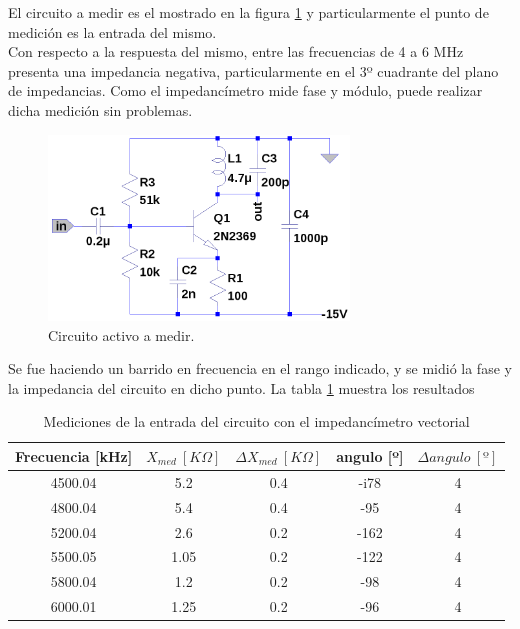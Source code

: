 \documentclass[a4paper,10pt]{article}
\begin{document}
		\indent El circuito a medir es el mostrado en la figura \ref{img006} y 
		particularmente el punto de medición es la entrada del mismo. \\
		\indent Con respecto a la respuesta del mismo, entre las frecuencias 
		de 4 a 6 MHz presenta una impedancia negativa, particularmente en el 3º
		cuadrante del plano de impedancias. Como el impedancímetro mide fase y
		módulo, puede realizar dicha medición sin problemas.
		
		\begin{figure}[!htb]
			\centering
			\includegraphics[width=8cm]{Imagenes/ActiveCircuit.png}
			\caption{Circuito activo a medir.}
			\label{img006} 
		\end{figure}

		\indent Se fue haciendo un barrido en frecuencia en el rango indicado,
		y se midió la fase y la impedancia del circuito en dicho punto. La 
		tabla \ref{tabbla} muestra los resultados

		\begin{table}[!htp]
			\centering
			\begin{tabular}{|c|c|c|c|c|}
				\hline
				Frecuencia [kHz] & $X_{med}~[K\Omega]$ & 
				$\Delta X_{med}~[K\Omega]$ & angulo [º] & $\Delta angulo~[º]$ \\
				\hline
				4500.04 & 5.2 & 0.4 & -i78 & 4 \\
				\hline
				4800.04 & 5.4 & 0.4 & -95 & 4 \\ 
				\hline
				5200.04 & 2.6 & 0.2 & -162 & 4 \\
				\hline
				5500.05 & 1.05 & 0.2 & -122 & 4 \\ 
				\hline									
				5800.04 & 1.2 & 0.2 & -98 & 4 \\
				\hline
				6000.01 & 1.25 & 0.2 & -96 & 4 \\
				\hline
			\end{tabular}
			\caption{Mediciones de la entrada del circuito con el 
			impedancímetro vectorial} \label{tabbla}
		\end{table}
		
\end{document}
